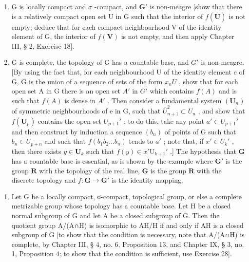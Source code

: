 \begin{enumerate}
\def\labelenumi{\alph{enumi})}
\item
  G is locally compact and \(\sigma\) -compact, and \(\mathbf{G}'\) is non-meagre {[}show that there is a relatively compact open set U in G such that the interior of \(f(\overline{\mathbf{U}})\) is not empty; deduce that for each compact neighbourhood V of the identity element of G, the interior of \(f(\mathbf{V})\) is not empty, and then apply Chapter III, § 2, Exercise 18{]}.
\item
  G is complete, the topology of G has a countable base, and \(G'\) is non-meagre. {[}By using the fact that, for each neighbourhood U of the identity element e of G, G is the union of a sequence of sets of the form \(x_{n}U\) , show that for each open set A in G there is an open set \(A'\) in \(G'\) which contains \(f(A)\) and is such that \(f(A)\) is dense in \(A'\) . Then consider a fundamental system \((\mathbf{U}_{n})\) of symmetric neighbourhoods of e in G, such that \(\overline{U}_{n+1}^{2} \subset U_{n}\) , and show that \(f(\mathbf{U}_{p})\) contains the open set \(U_{p+1}'\) ; to do this, take any point \(a' \in U_{p+1}'\) and then construct by induction a sequence \((b_{n})\) of points of G such that \(b_{n} \in U_{p+n}\) and such that \(f(b_{1}b_{2}\ldots b_{n})\) tends to \(a'\) ; note that, if \(x' \in U_{k}'\) , then there exists \(y \in \mathbf{U}_k\) such that \(f(y) \in x' \mathrm{U}_{k+1}'\) .{]} The hypothesis that \(\mathbf{G}\) has a countable base is essential, as is shown by the example where \(\mathbf{G}'\) is the group \(\mathbf{R}\) with the topology of the real line, \(\mathbf{G}\) is the group \(\mathbf{R}\) with the discrete topology and \(f: \mathbf{G} \to \mathbf{G}'\) is the identity mapping.
\end{enumerate}

\begin{enumerate}
\def\labelenumi{\arabic{enumi})}
\setcounter{enumi}{28}
\tightlist
\item
  Let G be a locally compact, σ-compact, topological group, or else a complete metrizable group whose topology has a countable base. Let H be a closed normal subgroup of G and let A be a closed subgroup of G. Then the quotient group A/(A∩H) is isomorphic to AH/H if and only if AH is a closed subgroup of G {[}to show that the condition is necessary, note that A/(A∩H) is complete, by Chapter III, § 4, no. 6, Proposition 13, and Chapter IX, § 3, no. 1, Proposition 4; to show that the condition is sufficient, use Exercise 28{]}.
\end{enumerate}

